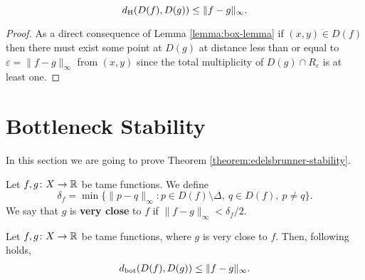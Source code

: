 \begin{theorem} \label{theorem:hausdorff-stability}
$$
    d_{\operatorname{H}}(D(f), D(g)) \leq \| f - g \|_\infty.
$$
\end{theorem}
\begin{proof}
    As a direct consequence of Lemma \ref{lemma:box-lemma} if $ (x, y)\in D(f) $ then there must exist some point at $ D(g) $ at distance less than or equal to $ \varepsilon =  \| f - g \|_\infty $ from $(x, y) $ since the total multiplicity of $ D(g) \cap R_\varepsilon $ is at least one.
\end{proof}

\section{Bottleneck Stability} \label{sec:bot-stability}
In this section we are going to prove Theorem \ref{theorem:edelsbrunner-stability}. 

\begin{definition}
    Let $ f, g \colon X \to \mathbb R $ be tame functions. We define
    $$
        \delta_f = \min \{ \|p - q\|_\infty : p \in D(f) \setminus \Delta, \ q \in D(f), \ p \neq q\}.
    $$
    We say that $ g $ is {\bf very close} to $ f $ if $\|f-g\|_\infty < \delta_f / 2$.
\end{definition}

\begin{lemma} \label{lemma:easy-biyection}
    Let $ f, g \colon X \to \mathbb R $ be tame functions, where $ g $ is very close to $ f $. Then, following holds,
    \begin{align}
        d_{\operatorname{bot}}(D(f), D(g)) \leq \|f - g \|_\infty.
    \end{align}
\end{lemma}


